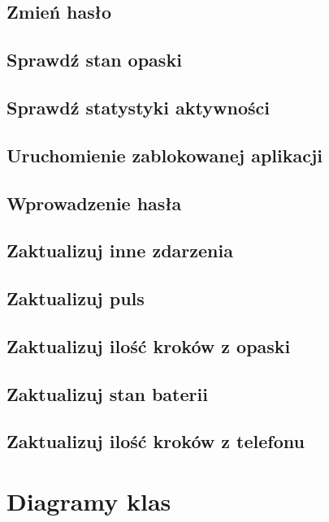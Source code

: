 \subsection{Zmień hasło}

\subsection{Sprawdź stan opaski}

\subsection{Sprawdź statystyki aktywności}

\subsection{Uruchomienie zablokowanej aplikacji}

\subsection{Wprowadzenie hasła}

\subsection{Zaktualizuj inne zdarzenia}

\subsection{Zaktualizuj puls}

\subsection{Zaktualizuj ilość kroków z opaski}

\subsection{Zaktualizuj stan baterii}

\subsection{Zaktualizuj ilość kroków z telefonu}

\section{Diagramy klas}

